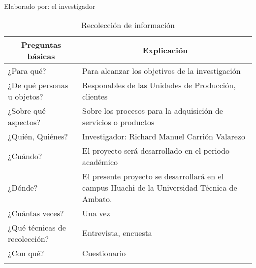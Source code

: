 \begin{ThreePartTable}
	\begin{TableNotes}[flushleft]
		\centering
		\item Elaborado por: el investigador
	\end{TableNotes}
	\begin{longtable}{p{} p{}}
		\caption{Recolección de información}
		\label{tab:recoleccion}                                                                           \\
		\toprule
		\multicolumn{1}{c}{\textbf{Preguntas básicas}} &
		\multicolumn{1}{c}{\textbf{Explicación}}                                                        \\
		\toprule
		¿Para qué?                                       & Para alcanzar los objetivos de la
		investigación                                                                                     \\
		¿De qué personas u objetos?                      & Responables de las Unidades de Producción, clientes \\
		¿Sobre qué aspectos?                             & Sobre los procesos para la adquisición de
		servicios o productos                                                                                         \\
		¿Quién, Quiénes?                                 & Investigador: Richard Manuel Carrión
		Valarezo                                                                                          \\
		¿Cuándo?                                         & El proyecto será desarrollado en el periodo
		académico \periodo                                                       \\
		¿Dónde?                                          & El presente proyecto se desarrollará en el
		campus Huachi de la Universidad Técnica de Ambato.                                              \\
		¿Cuántas veces?                                  & Una vez                                        \\
		¿Qué técnicas de recolección?                     & Entrevista, encuesta                           \\
		¿Con qué?                                        & Cuestionario                                   \\
		\bottomrule
		\insertTableNotes
	\end{longtable}
\end{ThreePartTable}
